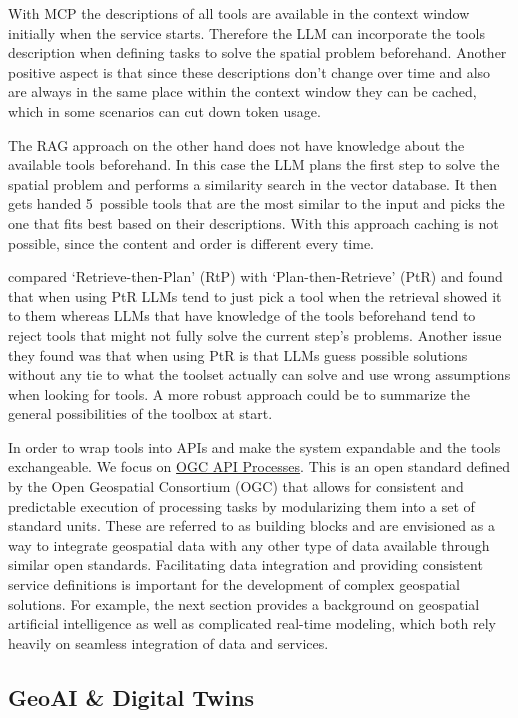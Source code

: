 With MCP the descriptions of all tools are available in the context window initially when the
service starts. Therefore the LLM can incorporate the tools description when defining tasks to
solve the spatial problem beforehand. Another positive aspect is that since these descriptions
don't change over time and also are always in the same place within the context window they can
be cached, which in some scenarios can cut down token usage.

The RAG approach on the other hand does not have knowledge about the available tools beforehand.
In this case the LLM plans the first step to solve the spatial problem and performs a similarity
search in the vector database. It then gets handed 5~possible tools that are the most similar to
the input and picks the one that fits best based on their descriptions. With this approach
caching is not possible, since the content and order is different every time.

\citet{zhang2026} compared `Retrieve-then-Plan' (RtP) with `Plan-then-Retrieve' (PtR) and found
that when using PtR LLMs tend to just pick a tool when the retrieval showed it to them whereas
LLMs that have knowledge of the tools beforehand tend to reject tools that might not fully solve
the current step's problems. Another issue they found was that when using PtR is that LLMs guess
possible solutions without any tie to what the toolset actually can solve and use wrong
assumptions when looking for tools. A more robust approach could be to summarize the general
possibilities of the toolbox at start.

In order to wrap tools into APIs and make the system expandable and the tools exchangeable. We
focus on \href{https://ogcapi.ogc.org/processes/}{OGC API Processes}. This is an open standard
defined by the Open Geospatial Consortium (OGC) that allows for consistent and predictable
execution of processing tasks by modularizing them into a set of standard units. These are
referred to as building blocks and are envisioned as a way to integrate geospatial data with any
other type of data available through similar open standards. Facilitating data integration and
providing consistent service definitions is important for the development of complex geospatial
solutions. For example, the next section provides a background on geospatial artificial
intelligence as well as complicated real-time modeling, which both rely heavily on seamless
integration of data and services.

\subsection{GeoAI \& Digital Twins}
\label{sec:geoai}

